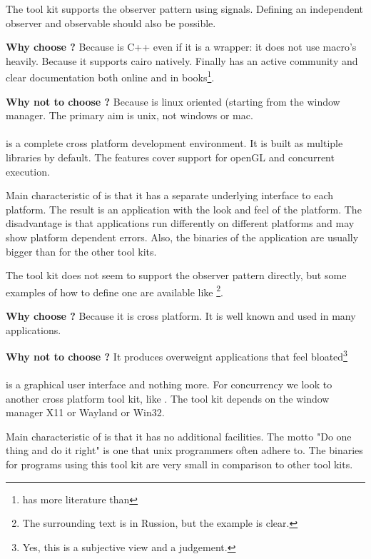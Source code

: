 The tool kit  supports the observer pattern using signals. Defining
an independent observer and observable should also be possible.

\textbf{Why choose ?} Because  is C++ even if it is
a wrapper: it does not use macro's heavily. Because it supports cairo natively. 
Finally  has an active community and clear documentation both online and
in books\footnote{ has more literature than }.

\textbf{Why not to choose ?} Because  is linux oriented (starting
from the  window manager. The primary aim is unix, not windows or mac.

\paragraph{}
is a complete cross platform development environment. It is built as multiple
libraries by default. The features cover support for openGL and concurrent execution.

Main characteristic of  is that it has a separate underlying interface
to each platform. The result is an application with the look and feel of the
platform. The disadvantage is that applications run differently on different platforms 
and may show platform dependent errors. Also, the binaries of the application are
usually bigger than for the other tool kits.

The tool kit  does not seem to support the observer pattern directly, but
some examples of how to define one are available like \cite{wxwidget:observer-example}\footnote{The 
surrounding text is in Russion, but the example is clear.}.

\textbf{Why choose ?} Because it is cross platform. It is well known and used
in many applications.
 
\textbf{Why not to choose ?} It produces overweignt applications that feel bloated\footnote{Yes, this
is a subjective view and a judgement.}

\paragraph{}
is a graphical user interface and nothing more. For concurrency we
look to another cross platform tool kit, like . The tool kit 
depends on the window manager X11 or Wayland or Win32.

Main characteristic of  is that it has no additional facilities. 
The motto "Do one thing and do it right" is one that unix programmers often 
adhere to. The binaries for programs using this tool kit are very small in comparison 
to other tool kits. 

